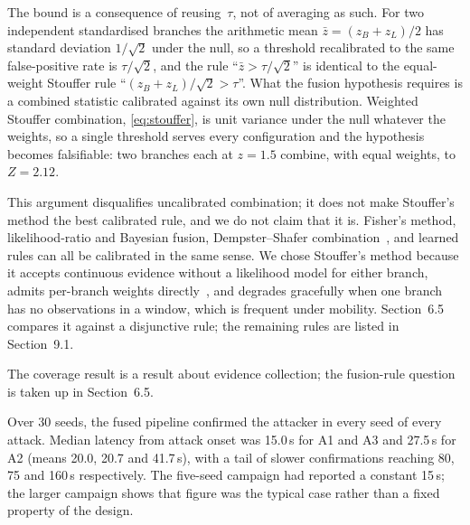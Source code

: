 The bound is a consequence of reusing~$\tau$, not of averaging as such.
For two independent standardised branches the arithmetic mean
$\bar{z} = (z_B + z_L)/2$ has standard deviation $1/\sqrt{2}$ under the
null, so a threshold recalibrated to the same false-positive rate is
$\tau/\sqrt{2}$, and the rule ``$\bar{z} > \tau/\sqrt{2}$'' is identical to
the equal-weight Stouffer rule ``$(z_B + z_L)/\sqrt{2} > \tau$''. What the
fusion hypothesis requires is a combined statistic calibrated against its
own null distribution. Weighted Stouffer combination,
\eqref{eq:stouffer}, is unit variance under the null whatever the weights,
so a single threshold serves every configuration and the hypothesis becomes
falsifiable: two branches each at $z=1.5$ combine, with equal weights, to
$Z=2.12$.

This argument disqualifies uncalibrated combination; it does not make
Stouffer's method the best calibrated rule, and we do not claim that it is.
Fisher's method, likelihood-ratio and Bayesian fusion, Dempster--Shafer
combination~\cite{singh2020}, and learned rules can all be calibrated in
the same sense. We chose Stouffer's method because it accepts continuous
evidence without a likelihood model for either branch, admits per-branch
weights directly~\cite{whitlock2005weighted}, and degrades gracefully when
one branch has no observations in a window, which is frequent under
mobility. Section~6.5 compares it against a disjunctive rule; the remaining
rules are listed in Section~9.1.



The coverage result is a result about evidence collection; the fusion-rule
question is taken up in Section~6.5.

Over 30 seeds, the fused pipeline confirmed the attacker in every seed of
every attack. Median latency from attack onset was 15.0\,s for A1 and A3
and 27.5\,s for A2 (means 20.0, 20.7 and 41.7\,s), with a tail of slower
confirmations reaching 80, 75 and 160\,s respectively. The five-seed
campaign had reported a constant 15\,s; the larger campaign shows that
figure was the typical case rather than a fixed property of the design.

